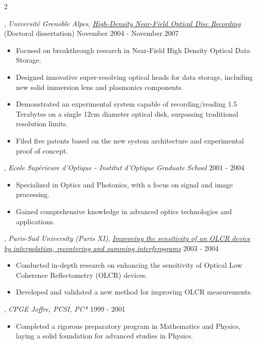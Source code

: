 \begin{multicols}{2}

, \textit{Université Grenoble Alpes}, \href{https://theses.hal.science/tel-00493016/document}{\textit{High-Density Near-Field Optical Disc Recording}} (Doctoral dissertation) \hfill November 2004 - November 2007
\begin{itemize}
\item Focused on breakthrough research in Near-Field High Density Optical Data Storage.
\item Designed innovative super-resolving optical heads for data storage, including new solid immersion lens and plasmonics components.
\item Demonstrated an experimental system capable of recording/reading 1.5 Terabytes on a single 12cm diameter optical disk, surpassing traditional resolution limits.
\item Filed five patents based on the new system architecture and experimental proof of concept.
\end{itemize}

, \textit{Ecole Supérieure d'Optique - Institut d’Optique Graduate School} \hfill 2001 - 2004
\begin{itemize}
\item Specialized in Optics and Photonics, with a focus on signal and image processing.
\item Gained comprehensive knowledge in advanced optics technologies and applications.
\end{itemize}

, \textit{Paris-Sud University (Paris XI)}, \href{https://www.researchgate.net/profile/C-Lepers/publication/237587056_AMELIORATION_DE_LA_SENSIBILITE_D%27UN_DISPOSITIF_OLCR_PAR_INTERPOLATION_RECADRAGE_ET_SOMMATION_D%27INTERFEROGRAMMES/links/00b7d53c53c4232e86000000/AMELIORATION-DE-LA-SENSIBILITE-DUN-DISPOSITIF-OLCR-PAR-INTERPOLATION-RECADRAGE-ET-SOMMATION-DINTERFEROGRAMMES.pdf}{\textit{Improving the sensitivity of an OLCR device by interpolation, recentering and summing interferograms}} \hfill 2003 - 2004
\begin{itemize}
\item Conducted in-depth research on enhancing the sensitivity of Optical Low Coherence Reflectometry (OLCR) devices.
\item Developed and validated a new method for improving OLCR measurements.
\end{itemize}

, \textit{CPGE Joffre, PCSI, PC*} \hfill 1999 - 2001
\begin{itemize}
\item Completed a rigorous preparatory program in Mathematics and Physics, laying a solid foundation for advanced studies in Physics.
\end{itemize}


\end{multicols}